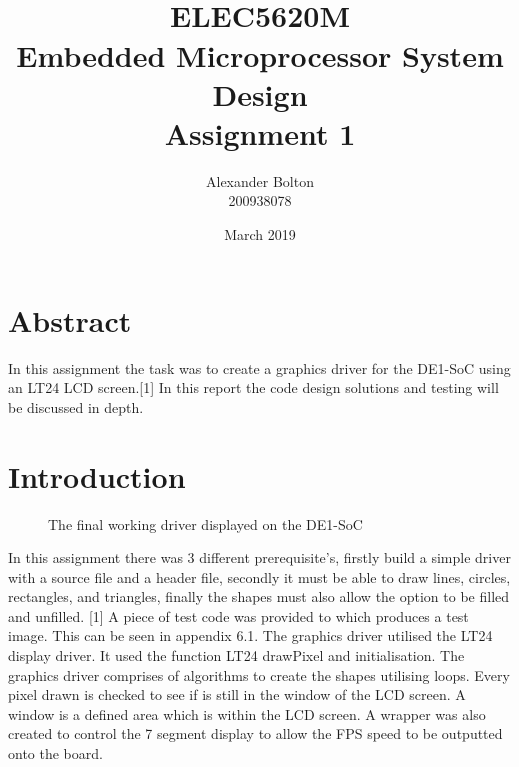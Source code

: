 \documentclass[a4paper,12pt]{article}
\begin{document}
\title{\\ ELEC5620M \\ Embedded Microprocessor System Design \\ Assignment 1}
\author{Alexander Bolton \\ 200938078}
\date{March 2019}
\maketitle
\section{Abstract}
In this assignment the task was to create a graphics driver for the DE1-SoC using an LT24 LCD screen.[1] In this report the code design solutions and testing will be discussed in depth.  
\newpage

\tableofcontents
\newpage

\section{Introduction}
\begin{figure}[h]
	\centering
	\caption{The final working driver displayed on the DE1-SoC}
\end{figure}

\begin{flushleft}
In this assignment there was 3 different prerequisite's, firstly build a simple driver with a source file and a header file, secondly it must be able to draw lines, circles, rectangles, and triangles, finally the shapes must also allow the option to be filled and unfilled. [1] A piece of test code was provided to which produces a test image. This can be seen in appendix 6.1. 
\newline
\newline
The graphics driver utilised the LT24 display driver. It used the function LT24 drawPixel and initialisation. The graphics driver comprises of algorithms to create the shapes utilising loops. Every pixel drawn is checked to see if is still in the window of the LCD screen. A window is a defined area which is within the LCD screen. A wrapper was also created to control the 7 segment display to allow the FPS speed to be outputted onto the board.
\end{flushleft}
\end{document}
